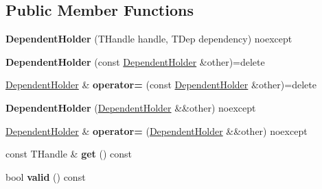 \subsection*{Public Member Functions}
\begin{DoxyCompactItemize}
\item 
\mbox{\label{structblaze_1_1vkw_1_1base_1_1DependentHolder_a1ed19fa0798e21238065d1cb3f600ca5}} 
{\bfseries Dependent\+Holder} (T\+Handle handle, T\+Dep dependency) noexcept
\item 
\mbox{\label{structblaze_1_1vkw_1_1base_1_1DependentHolder_a9da72f8dc993cc3d118c81c149a27f89}} 
{\bfseries Dependent\+Holder} (const \hyperlink{structblaze_1_1vkw_1_1base_1_1DependentHolder}{Dependent\+Holder} \&other)=delete
\item 
\mbox{\label{structblaze_1_1vkw_1_1base_1_1DependentHolder_a3d080f63125b31555a302f95c6c5b8fd}} 
\hyperlink{structblaze_1_1vkw_1_1base_1_1DependentHolder}{Dependent\+Holder} \& {\bfseries operator=} (const \hyperlink{structblaze_1_1vkw_1_1base_1_1DependentHolder}{Dependent\+Holder} \&other)=delete
\item 
\mbox{\label{structblaze_1_1vkw_1_1base_1_1DependentHolder_a3acc433104c31698c760ddcad583839f}} 
{\bfseries Dependent\+Holder} (\hyperlink{structblaze_1_1vkw_1_1base_1_1DependentHolder}{Dependent\+Holder} \&\&other) noexcept
\item 
\mbox{\label{structblaze_1_1vkw_1_1base_1_1DependentHolder_a3f78bf0cdac98d49796f3af32eb6393f}} 
\hyperlink{structblaze_1_1vkw_1_1base_1_1DependentHolder}{Dependent\+Holder} \& {\bfseries operator=} (\hyperlink{structblaze_1_1vkw_1_1base_1_1DependentHolder}{Dependent\+Holder} \&\&other) noexcept
\item 
\mbox{\label{structblaze_1_1vkw_1_1base_1_1DependentHolder_ac36f1b078ef4e6fb08be34ebc1101679}} 
const T\+Handle \& {\bfseries get} () const
\item 
\mbox{\label{structblaze_1_1vkw_1_1base_1_1DependentHolder_a1349c85effef6bbfd027c43603fa4685}} 
bool {\bfseries valid} () const
\end{DoxyCompactItemize}
